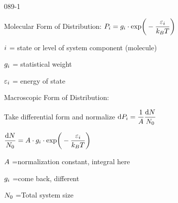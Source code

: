\begin{mitframe}{089-1}

\begin{listone}
	\item Molecular Form of Distribution: $\p_{\state}=\grav_{\state}\cdot\text{exp}\bigg(-\dfrac{\varepsilon_{\state}}{\boltz\Temp}\bigg)$
    
   \begin{listtwo}
		\item $\state$ = state or level of system component (molecule)
		\item $\grav_{\state}$ = statistical weight
		\item $\varepsilon_{\state}$ = energy of state
	\end{listtwo}

	\item Macroscopic Form of Distribution:
	
    \begin{listtwo}
    	\item Take differential form and normalize $\mathrm{d}\p_{\state}=\dfrac{1}{\helmholtz}\dfrac{\mathrm{d}\nummoles}{\nummoles_{\init}}$
        
    	\begin{listthree}
        	\item $\dfrac{\mathrm{d}\nummoles}{\nummoles_{\init}}=\helmholtz\cdot\grav_{\state}\cdot\text{exp}\bigg(-\dfrac{\varepsilon_{\state}}{\boltz\Temp}\bigg)$
            \item $\helmholtz$ =normalization constant, integral here
			\item $\grav_{\state}$ =come back, different
            \item $\nummoles_{\init}$ =Total system size
		\end{listthree}
    \end{listtwo}
\end{listone}    

\end{mitframe}